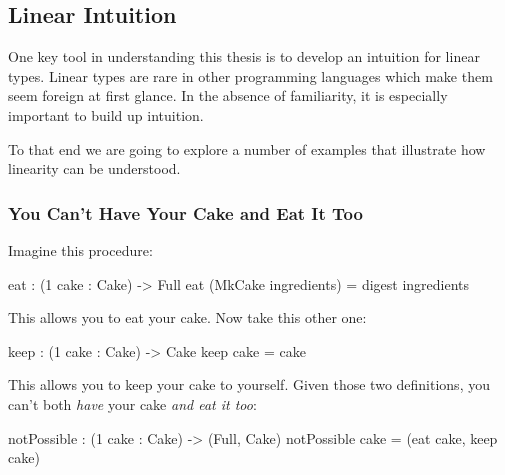 \documentclass[
]{article}
\newenvironment{Shaded}{}{}
\newcommand{\DataTypeTok}[1]{\textcolor[rgb]{0.56,0.13,0.00}{#1}}
\newcommand{\DecValTok}[1]{\textcolor[rgb]{0.25,0.63,0.44}{#1}}
\newcommand{\NormalTok}[1]{#1}
\newcommand{\OperatorTok}[1]{\textcolor[rgb]{0.40,0.40,0.40}{#1}}
\newcommand{\OtherTok}[1]{\textcolor[rgb]{0.00,0.44,0.13}{#1}}
\begin{document}
\hypertarget{linear-intuition}{%
\subsection{Linear Intuition}\label{linear-intuition}}

One key tool in understanding this thesis is to develop an intuition for
linear types. Linear types are rare in other programming languages which
make them seem foreign at first glance. In the absence of familiarity,
it is especially important to build up intuition.

To that end we are going to explore a number of examples that illustrate
how linearity can be understood.

\hypertarget{you-cant-have-your-cake-and-eat-it-too}{%
\subsubsection{You Can't Have Your Cake and Eat It
Too}\label{you-cant-have-your-cake-and-eat-it-too}}

Imagine this procedure:

\begin{Shaded}
\begin{Highlighting}[]
\NormalTok{eat }\OperatorTok{:}\NormalTok{ (}\DecValTok{1}\NormalTok{ cake }\OperatorTok{:} \DataTypeTok{Cake}\NormalTok{) }\OtherTok{{-}\textgreater{}} \DataTypeTok{Full}
\NormalTok{eat (}\DataTypeTok{MkCake}\NormalTok{ ingredients) }\OtherTok{=}\NormalTok{ digest ingredients}
\end{Highlighting}
\end{Shaded}

This allows you to eat your cake. Now take this other one:

\begin{Shaded}
\begin{Highlighting}[]
\NormalTok{keep }\OperatorTok{:}\NormalTok{ (}\DecValTok{1}\NormalTok{ cake }\OperatorTok{:} \DataTypeTok{Cake}\NormalTok{) }\OtherTok{{-}\textgreater{}} \DataTypeTok{Cake}
\NormalTok{keep cake }\OtherTok{=}\NormalTok{ cake}
\end{Highlighting}
\end{Shaded}

This allows you to keep your cake to yourself. Given those two
definitions, you can't both \emph{have} your cake \emph{and eat it too}:

\begin{Shaded}
\begin{Highlighting}[]
\NormalTok{notPossible }\OperatorTok{:}\NormalTok{ (}\DecValTok{1}\NormalTok{ cake }\OperatorTok{:} \DataTypeTok{Cake}\NormalTok{) }\OtherTok{{-}\textgreater{}}\NormalTok{ (}\DataTypeTok{Full}\NormalTok{, }\DataTypeTok{Cake}\NormalTok{)}
\NormalTok{notPossible cake }\OtherTok{=}\NormalTok{ (eat cake, keep cake)}
\end{Highlighting}
\end{Shaded}
\end{document}
